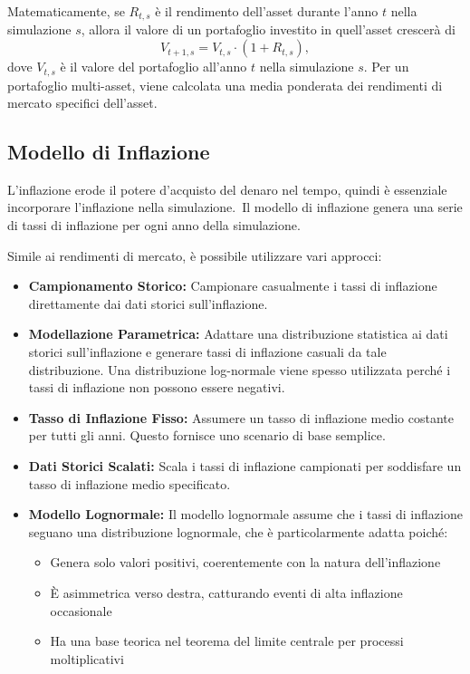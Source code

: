     Matematicamente, se \(R_{t,s}\) è il rendimento dell'asset durante l'anno
    \(t\) nella simulazione \(s\), allora il valore di un portafoglio investito
    in quell'asset crescerà di
    \[
    V_{t+1,s} = V_{t,s} \cdot (1 + R_{t,s}),
    \]
    dove \(V_{t,s}\) è il valore del portafoglio all'anno \(t\) nella
    simulazione \(s\).
    Per un portafoglio multi-asset, viene calcolata una media
    ponderata dei rendimenti di mercato specifici dell'asset.

    \subsection{Modello di Inflazione}\label{subsec:modello-di-inflazione}

L'inflazione erode il potere d'acquisto del denaro nel tempo, quindi è
essenziale incorporare l'inflazione nella simulazione.\ Il modello di inflazione
genera una serie di tassi di inflazione per ogni anno della simulazione.

Simile ai rendimenti di mercato, è possibile utilizzare vari approcci:
\begin{itemize}
    \item \textbf{Campionamento Storico:} Campionare casualmente i tassi di
    inflazione direttamente dai dati storici sull'inflazione.
    \item \textbf{Modellazione Parametrica:} Adattare una distribuzione
    statistica ai dati storici sull'inflazione e generare tassi di inflazione
    casuali da tale distribuzione.
    Una distribuzione log-normale viene spesso
    utilizzata perché i tassi di inflazione non possono essere negativi.
    \item \textbf{Tasso di Inflazione Fisso:} Assumere un tasso di inflazione
    medio costante per tutti gli anni.
    Questo fornisce uno scenario di base
    semplice.
    \item \textbf{Dati Storici Scalati:} Scala i tassi di inflazione campionati
    per soddisfare un tasso di inflazione medio specificato.
    \item \textbf{Modello Lognormale:} Il modello lognormale assume che i tassi
    di inflazione seguano una distribuzione lognormale, che è particolarmente
    adatta poiché:
    \begin{itemize}
        \item Genera solo valori positivi, coerentemente con la natura
        dell'inflazione
        \item È asimmetrica verso destra, catturando eventi di alta inflazione
        occasionale
        \item Ha una base teorica nel teorema del limite centrale per processi
        moltiplicativi
    \end{itemize}
\end{itemize}

